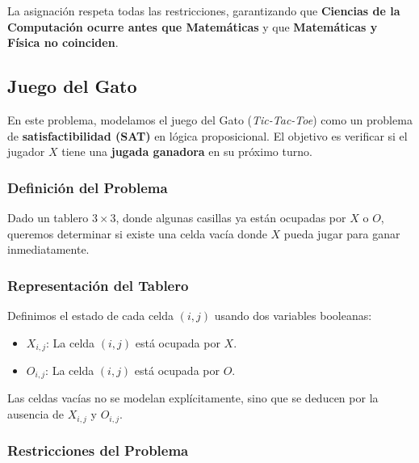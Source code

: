 La asignación respeta todas las restricciones, garantizando que \textbf{Ciencias de la Computación ocurre antes que Matemáticas} y que \textbf{Matemáticas y Física no coinciden}.





\subsection{Juego del Gato}
En este problema, modelamos el juego del Gato (\textit{Tic-Tac-Toe}) como un problema de \textbf{satisfactibilidad (SAT)} en lógica proposicional. El objetivo es verificar si el jugador \(X\) tiene una \textbf{jugada ganadora} en su próximo turno.

\subsubsection*{Definición del Problema}

Dado un tablero \(3 \times 3\), donde algunas casillas ya están ocupadas por \(X\) o \(O\), queremos determinar si existe una celda vacía donde \(X\) pueda jugar para ganar inmediatamente.

\subsubsection*{Representación del Tablero}

Definimos el estado de cada celda \((i,j)\) usando dos variables booleanas:

\begin{itemize}
    \item \( X_{i,j} \): La celda \((i,j)\) está ocupada por \(X\).
    \item \( O_{i,j} \): La celda \((i,j)\) está ocupada por \(O\).
\end{itemize}

Las celdas vacías no se modelan explícitamente, sino que se deducen por la ausencia de \(X_{i,j}\) y \(O_{i,j}\).

\subsubsection*{Restricciones del Problema}

